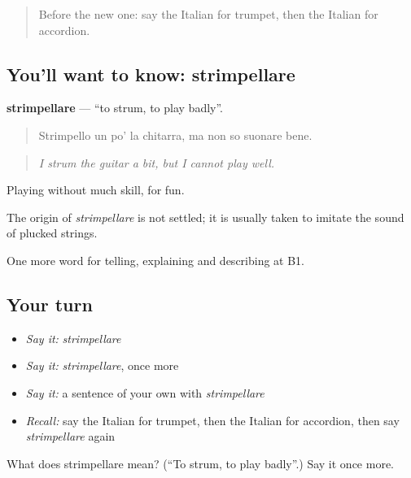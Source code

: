 \begin{quote}
Before the new one: say the Italian for trumpet, then the Italian for accordion.
\end{quote}

\subsection*{You'll want to know: strimpellare}
\textbf{strimpellare} — \textquotedblleft{}to strum, to play badly\textquotedblright{}.

\begin{quote}
Strimpello un po' la chitarra, ma non so suonare bene.
\end{quote}

\begin{quote}
\emph{I strum the guitar a bit, but I cannot play well.}
\end{quote}

Playing without much skill, for fun.

\begin{cousinweb}
The origin of \emph{strimpellare} is not settled; it is usually taken to imitate the sound of plucked strings.
\end{cousinweb}

\begin{grammarlens}[title={What you've built}]
One more word for telling, explaining and describing at B1.
\end{grammarlens}

\subsection*{Your turn}
\begin{itemize}
\raggedright
  \item \emph{Say it:} \emph{strimpellare}
  \item \emph{Say it:} \emph{strimpellare}, once more
  \item \emph{Say it:} a sentence of your own with \emph{strimpellare}
  \item \emph{Recall:} say the Italian for trumpet, then the Italian for accordion, then say \emph{strimpellare} again
\end{itemize}

\begin{tcolorbox}[breakable,colback=teal!4,colframe=teal!35!black,title={Before you move on}]
What does strimpellare mean? (\textquotedblleft{}To strum, to play badly\textquotedblright{}.) Say it once more.
\end{tcolorbox}
